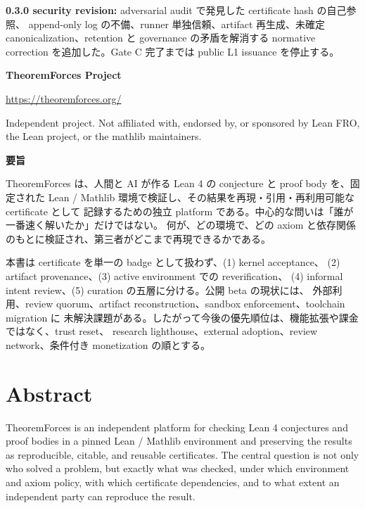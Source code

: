 \documentclass[a4paper,11pt]{ltjsarticle}
\begin{document}
\begin{titlepage}
\begin{tcolorbox}[
  colback=white,colframe=TFLine,boxrule=0.6pt,arc=2mm,
  left=5mm,right=5mm,top=4mm,bottom=4mm]
\medskip
\textbf{0.3.0 security revision:} adversarial audit で発見した certificate hash の自己参照、
append-only log の不備、runner 単独信頼、artifact 再生成、未確定 canonicalization、retention と
governance の矛盾を解消する normative correction を追加した。Gate C 完了までは public L1 issuance を停止する。
\end{tcolorbox}

\vfill
{\sffamily\large\bfseries\color{TFNavy}TheoremForces Project}\par
{\sffamily\color{TFMuted}\url{https://theoremforces.org/}}\par
\vspace{5mm}
{\footnotesize\color{TFMuted}
Independent project. Not affiliated with, endorsed by, or sponsored by Lean FRO,
the Lean project, or the mathlib maintainers.}
\end{titlepage}

\hypersetup{pageanchor=true}

\begin{tcolorbox}[
  colback=TFNavy,colframe=TFNavy,arc=2mm,
  left=5mm,right=5mm,top=4mm,bottom=4mm]
{\sffamily\bfseries\large\color{white}要旨}

\color{white!92}
TheoremForces は、人間と AI が作る Lean 4 の conjecture と proof body を、固定された
Lean / Mathlib 環境で検証し、その結果を再現・引用・再利用可能な certificate として
記録するための独立 platform である。中心的な問いは「誰が一番速く解いたか」だけではない。
何が、どの環境で、どの axiom と依存関係のもとに検証され、第三者がどこまで再現できるかである。

本書は certificate を単一の badge として扱わず、(1) kernel acceptance、
(2) artifact provenance、(3) active environment での reverification、
(4) informal intent review、(5) curation の五層に分ける。公開 beta の現状には、
外部利用、review quorum、artifact reconstruction、sandbox enforcement、toolchain migration に
未解決課題がある。したがって今後の優先順位は、機能拡張や課金ではなく、trust reset、
research lighthouse、external adoption、review network、条件付き monetization の順とする。
\end{tcolorbox}

\section*{Abstract}
TheoremForces is an independent platform for checking Lean 4 conjectures and proof bodies in a
pinned Lean / Mathlib environment and preserving the results as reproducible, citable, and reusable
certificates. The central question is not only who solved a problem, but exactly what was checked,
under which environment and axiom policy, with which certificate dependencies, and to what extent
an independent party can reproduce the result.
\end{document}
